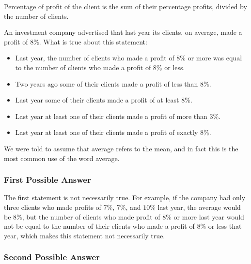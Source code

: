 
\begin{definition}
  \label{def:percentage_of_profit}

  Percentage of profit of the client is the sum of their percentage profits,
  divided by the number of clients.
\end{definition}

An investment company advertised that last year its clients, on average,
made a profit of $8 \%$. What is true about this statement:

\begin{itemize}
  \label{item:possible_answers}

  \item Last year, the number of clients who made a profit of $8 \%$ or
    more was equal to the number of clients who made a profit of $8 \%$ or
    less.
  \item Two years ago some of their clients made a profit of less than
    $8 \%$.
  \item Last year some of their clients made a profit of at least $8 \%$.
  \item Last year at least one of their clients made a profit of more than $3
    \%$.
  \item Last year at least one of their clients made a profit of exactly
    $8 \%$.
\end{itemize}

We were told to assume that average refers to the mean, and in fact this is
the most common use of the word average.

\subsubsection{First Possible Answer}
\label{sub_sub_sec:first_possible_answer}

The first statement is not necessarily true. For example, if the
company had only three clients who made profits of $7 \%$, $7 \%$, and $10
\%$ last year, the average would be $8 \%$, but the number of clients who
made profit of $8 \%$ or more last year would not be equal to the number
of their clients who made a profit of $8 \%$ or less that year, which
makes this statement not necessarily true.


\subsubsection{Second Possible Answer}
\label{sub_sub_sec:second_possible_answer}

